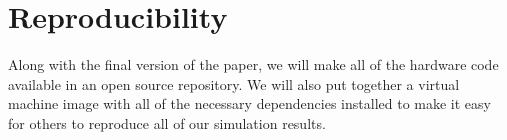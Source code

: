 \section{Reproducibility}

Along with the final version of the paper, we will make all of the hardware code available in an open source repository. We will also put together a virtual machine image with all of the necessary dependencies installed to make it easy for others to reproduce all of our simulation results.